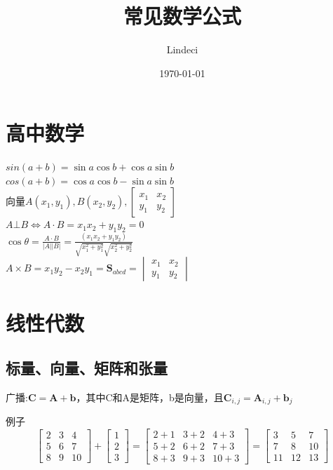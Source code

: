 \documentclass{article}
\title{常见数学公式}
\author{Lindeci}
\date{\today}
\begin{document}
\maketitle
\tableofcontents

\section{高中数学}
$sin(a+b) = \sin a \cos b + \cos a \sin b$ \\
$cos(a+b) = \cos a \cos b - \sin a \sin b$ \\
向量$A(x_1,y_1),B(x_2,y_2),
\begin{bmatrix}
x_1 & x_2 \\
y_1 & y_2
\end{bmatrix}
$ \\
$A \bot B \Leftrightarrow A \cdot B = x_1 x_2   + y_1 y_2 = 0$ \\
$ \cos \theta = \frac {A \cdot B} {\vert A \vert \vert B \vert} =\frac {(x_1 x_2 + y_1 y_2)} {\sqrt{x_1^2+y_1^2} \sqrt{x_2^2+y_2^2}}$ \\
$
A \times B = x_1  y_2 - x_2 y_1 = \mathbf{S}_{abcd} = 
\begin{vmatrix} x_1 & x_2 \\
y_1 & y_2 
\end{vmatrix}
$

\section{线性代数}
\subsection{标量、向量、矩阵和张量} 
广播:$\mathbf{C}=\mathbf{A}+\boldsymbol{b}$，其中C和A是矩阵，b是向量，且$\mathbf{C}_{i,j}=\mathbf{A}_{i,j}+\boldsymbol{b}_j$

例子
\[
\begin{bmatrix}
2 & 3 & 4 \\
5 & 6 & 7 \\
8 & 9 & 10
\end{bmatrix}
+
\begin{bmatrix}
1 \\
2 \\
3
\end{bmatrix}
=
\begin{bmatrix}
2+1 & 3+2 & 4+3 \\
5+2 & 6+2 & 7+3 \\
8+3 & 9+3 & 10+3
\end{bmatrix}
=
\begin{bmatrix}
3 & 5 & 7 \\
7 & 8 & 10 \\
11 & 12 & 13
\end{bmatrix}
\]
\end{document}
